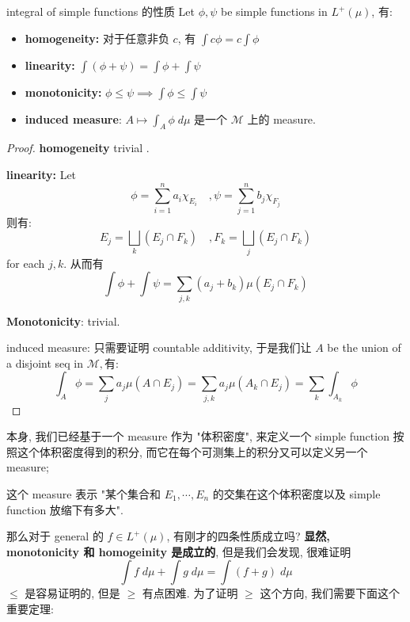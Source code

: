 \documentclass[lang=cn,11pt]{elegantbook}
\begin{document}
\begin{proposition}{integral of simple functions 的性质}
Let $\phi, \psi$ be simple functions in $L^+(\mu)$, 有:
\begin{itemize}
    \item \textbf{homogeneity:} 对于任意非负 $c$, 有 $\int c\phi = c\int \phi$
    \item \textbf{linearity:} $\int (\phi + \psi) = \int \phi + \int \psi$
    \item \textbf{monotonicity:} $\phi \leq \psi \implies \int \phi \leq \int \psi$
    \item \textbf{induced measure}: $A \mapsto \int_A \phi \; d\mu$ 是一个 $\mathcal{M}$ 上的 measure.
\end{itemize}
\end{proposition}
\begin{proof}
   \textbf{ homogeneity}  trivial .

  \textbf{  linearity:} Let  $$
    \phi = \sum_{i=1}^n a_i \chi_{E_i} \quad , \psi = \sum_{j=1}^n b_j \chi_{F_j}
    $$ 则有: $$
    E_j = \bigsqcup _k (E_j \cap F_k)\quad , F_k = \bigsqcup_j (E_j \cap F_k) $$ for each $j,k$. 从而有 $$ \int \phi + \int \psi = \sum_{j,k} (a_j + b_k) \mu(E_j \cap F_k)  $$

    \textbf{Monotonicity}: trivial.

    induced measure: 只需要证明 countable additivity, 于是我们让 $A$ be the union of a disjoint seq in $\mathcal{M}, 有:  $$$  \int_A  \phi = \sum_j a_j \mu(A \cap E_j) = \sum_{j,k}  a_j \mu(A_k \cap E_j)    = \sum_k \int_{A_k} \phi$$
\end{proof}
\begin{remark}
    本身, 我们已经基于一个 measure 作为 "体积密度", 来定义一个 simple function 按照这个体积密度得到的积分, 而它在每个可测集上的积分又可以定义另一个 measure; 
    
    这个 measure 表示 "某个集合和 $E_1, \cdots, E_n$ 的交集在这个体积密度以及 simple function 放缩下有多大".
\end{remark}



那么对于 general 的 $f\in L^+(\mu)$, 有刚才的四条性质成立吗? \textbf{显然, monotonicity 和 homogeinity 是成立的}, 但是我们会发现, 很难证明
$$
\int f \; d\mu + \int g \;d\mu = \int(f+g) \;d \mu
$$
$\leq $ 是容易证明的, 但是 $\geq$ 有点困难. 为了证明 $\geq$ 这个方向, 我们需要下面这个重要定理:
\end{document}
